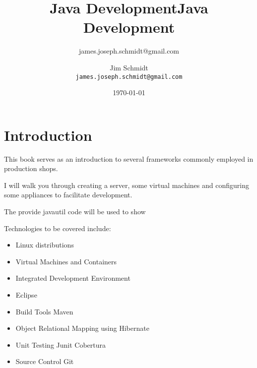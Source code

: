\documentclass[a4paper,10pt]{book}
\title{Java Development}
\author{james.joseph.schmidt@gmail.com}
\begin{document}
\title{Java Development}
\author{Jim Schmidt\\
  \texttt{james.joseph.schmidt@gmail.com}}
\date{\today}
\maketitle
\tableofcontents
\chapter{Introduction}
This book serves as an introduction to several frameworks commonly employed in production shops.

I will walk you through creating a server, some virtual machines and configuring some appliances to facilitate development.

The provide javautil code will be used to show

Technologies to be covered include:
\begin{itemize}
 \item Linux distributions
 \item Virtual Machines and Containers
 \item Integrated Development Environment
 \item Eclipse
 \item Build Tools
  Maven
 \item Object Relational Mapping using Hibernate
 \item Unit Testing 
   Junit 
    Cobertura
 \item Source Control 
   Git
\end{itemize}





\end{document}
